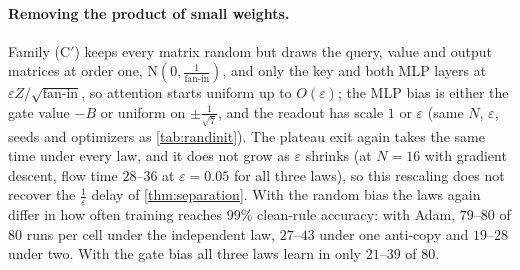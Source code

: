 \paragraph{Removing the product of small weights.} Family (C$'$) keeps every matrix random but draws the query, value and output matrices at order one,
$\mathrm N(0,\tfrac{1}{\text{fan-in}})$, and only the key and both MLP layers at $\varepsilon Z/\sqrt{\text{fan-in}}$, so attention starts uniform up to $O(\varepsilon)$;
the MLP bias is either the gate value $-B$ or uniform on $\pm\tfrac{1}{\sqrt7}$, and the readout has scale $1$ or $\varepsilon$
(same $N$, $\varepsilon$, seeds and optimizers as \cref{tab:randinit}). The plateau exit again takes the same time under
every law, and it does not grow as $\varepsilon$ shrinks (at $N=16$ with gradient descent, flow time $28$--$36$ at $\varepsilon=0.05$ for all three laws), so this rescaling does not
recover the $\tfrac{1}{\varepsilon}$ delay of \cref{thm:separation}. With the random bias the laws again differ in how often training reaches $99\%$ clean-rule accuracy:
with Adam, $79$--$80$ of $80$ runs per cell under the independent law, $27$--$43$ under one anti-copy and $19$--$28$ under two. With the gate bias all three laws learn
in only $21$--$39$ of $80$.

\begin{table}[t]
\centering\small
\caption{Fully random initialization, every matrix entry trained. Anti-copy law, $\eta=0.1$, binary cross-entropy, ten seeds per initialization.
Each cell: runs reaching $99\%$ clean-rule accuracy within the budget; Adam pools eight initializations, gradient descent the four with $\varepsilon\ge0.5$.}
\label{tab:randinit}

\end{table}

\begin{table}[t]
\centering\small
\caption{Untied one-block training under the anti-copy law. Every matrix entry trains; binary cross-entropy, $N=16$, $\eta=0.1$.
Each cell: seeds (of three) reaching $99\%$ clean-rule accuracy within gradient-flow time $3\times10^4$, and their median time.
$\kappa=1$: independent decoys; $\kappa=0$: one anti-copy; $\kappa=-1$: two anti-copies.}
\label{tab:untied}
\fitwidth{}
\end{table}
